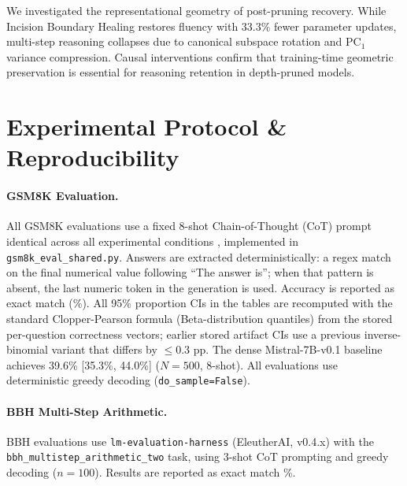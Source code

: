 \documentclass[pmlr,onecolumn]{jmlr}
\begin{document}
We investigated the representational geometry of post-pruning recovery. While Incision Boundary Healing restores fluency with 33.3\% fewer parameter updates, multi-step reasoning collapses due to canonical subspace rotation and $\mathrm{PC}_1$ variance compression. Causal interventions confirm that training-time geometric preservation is essential for reasoning retention in depth-pruned models.




\appendix
{\sloppy

\section{Experimental Protocol \& Reproducibility}
\label{app:protocol}

\paragraph{GSM8K Evaluation.}
All GSM8K evaluations use a fixed 8-shot Chain-of-Thought (CoT) prompt identical across all experimental conditions \citep{cobbe2021gsm8k}, implemented in \texttt{gsm8k\_eval\_shared.py}. Answers are extracted deterministically: a regex match on the final numerical value following ``The answer is''; when that pattern is absent, the last numeric token in the generation is used. Accuracy is reported as exact match (\%). All 95\% proportion CIs in the tables are recomputed with the standard Clopper-Pearson formula (Beta-distribution quantiles) from the stored per-question correctness vectors; earlier stored artifact CIs use a previous inverse-binomial variant that differs by $\le 0.3$ pp. The dense Mistral-7B-v0.1 baseline achieves 39.6\% [35.3\%, 44.0\%] ($N=500$, 8-shot). All evaluations use deterministic greedy decoding (\texttt{do\_sample=False}).

\paragraph{BBH Multi-Step Arithmetic.}
BBH evaluations use \texttt{lm-evaluation-harness} (EleutherAI, v0.4.x) with the \texttt{bbh\_multistep\_\allowbreak{}arithmetic\_two} task, using 3-shot CoT prompting and greedy decoding ($n=100$). Results are reported as exact match \%.

}
\end{document}
